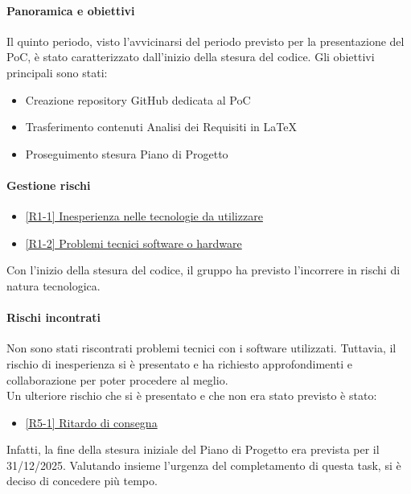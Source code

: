 \documentclass[a4paper,12pt]{article}
\begin{document}
            \paragraph{Panoramica e obiettivi}
            Il quinto periodo, visto l'avvicinarsi del periodo previsto per la presentazione del PoC, è stato caratterizzato dall'inizio della stesura del codice. Gli obiettivi principali sono stati:
            \begin{itemize}
                \item Creazione repository GitHub dedicata al PoC
                \item Trasferimento contenuti Analisi dei Requisiti in LaTeX
                \item Proseguimento stesura Piano di Progetto
            \end{itemize}
            
            \paragraph{Gestione rischi}
                \begin{itemize}
                \item\hyperref[tab:r1]{[R1-1] Inesperienza nelle tecnologie da utilizzare}
                \item\hyperref[tab:r1]{[R1-2] Problemi tecnici software o hardware}
                \end{itemize}
                Con l'inizio della stesura del codice, il gruppo ha previsto l'incorrere in rischi di natura tecnologica.
    
                \paragraph*{Rischi incontrati}
                Non sono stati riscontrati problemi tecnici con i software utilizzati. Tuttavia, il rischio di inesperienza si è presentato e ha richiesto approfondimenti e collaborazione per poter procedere al meglio.
                \\Un ulteriore rischio che si è presentato e che non era stato previsto è stato:
                \begin{itemize}
                    \item \hyperref[tab:r5]{[R5-1] Ritardo di consegna}
                \end{itemize}
                Infatti, la fine della stesura iniziale del Piano di Progetto era prevista per il 31/12/2025. Valutando insieme l'urgenza del completamento di questa task, si è deciso di concedere più tempo.
                
\end{document}
